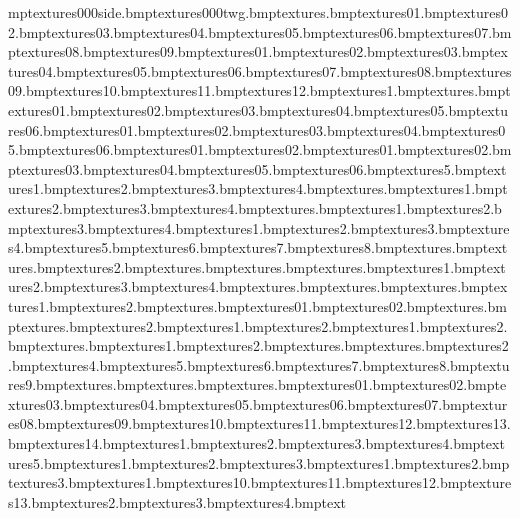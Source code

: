mp textures\1000side.bmp textures\1000twg.bmp textures\antanae.bmp textures\anvil01.bmp textures\anvil02.bmp textures\anvil03.bmp textures\anvil04.bmp textures\anvil05.bmp textures\anvil06.bmp textures\anvil07.bmp textures\anvil08.bmp textures\anvil09.bmp textures\anvilhuge01.bmp textures\anvilhuge02.bmp textures\anvilhuge03.bmp textures\anvilhuge04.bmp textures\anvilhuge05.bmp textures\anvilhuge06.bmp textures\anvilhuge07.bmp textures\anvilhuge08.bmp textures\anvilhuge09.bmp textures\anvilhuge10.bmp textures\anvilhuge11.bmp textures\anvilhuge12.bmp textures\arch1.bmp textures\arrow.bmp textures\blucage01.bmp textures\blucage02.bmp textures\blucage03.bmp textures\blucage04.bmp textures\blucage05.bmp textures\blucage06.bmp textures\bluhut01.bmp textures\bluhut02.bmp textures\bluhut03.bmp textures\bluhut04.bmp textures\bluhut05.bmp textures\bluhut06.bmp textures\bluhutdoor01.bmp textures\bluhutdoor02.bmp textures\bluhutwin01.bmp textures\bluhutwin02.bmp textures\bluhutwin03.bmp textures\bluhutwin04.bmp textures\bluhutwin05.bmp textures\bluhutwin06.bmp textures\bow5.bmp textures\bridge1.bmp textures\bridge2.bmp textures\bridge3.bmp textures\bridge4.bmp textures\bridgeside.bmp textures\bridgesnow1.bmp textures\bridgesnow2.bmp textures\bridgesnow3.bmp textures\bridgesnow4.bmp textures\bridsidextra.bmp textures\bridsnowedge1.bmp textures\bridsnowedge2.bmp textures\bridsnowedge3.bmp textures\bridsnowedge4.bmp textures\browtree1.bmp textures\browtree2.bmp textures\browtree3.bmp textures\browtree4.bmp textures\browtree5.bmp textures\browtree6.bmp textures\browtree7.bmp textures\browtree8.bmp textures\burgbun.bmp textures\burgersign.bmp textures\burgersign2.bmp textures\burgmeat.bmp textures\burgtom.bmp textures\cagebars.bmp textures\cagedoor1.bmp textures\cagedoor2.bmp textures\cagedoor3.bmp textures\cagedoor4.bmp textures\cake.bmp textures\can.bmp textures\canhole.bmp textures\carzywall1.bmp textures\carzywall2.bmp textures\chickleg.bmp textures\choc01.bmp textures\choc02.bmp textures\chocblu.bmp textures\chocwap.bmp textures\chocwap2.bmp textures\clangersign1.bmp textures\clangersign2.bmp textures\cornerwall1.bmp textures\cornerwall2.bmp textures\crackwile.bmp textures\creamwall1.bmp textures\creamwall2.bmp textures\cupbfrt.bmp textures\cupstuff.bmp textures\dangeranvils2.bmp textures\dangeranvils4.bmp textures\dangeranvils5.bmp textures\dangeranvils6.bmp textures\dangeranvils7.bmp textures\dangeranvils8.bmp textures\dangeranvils9.bmp textures\dangercross.bmp textures\dangertarget.bmp textures\dangertargetsand.bmp textures\dirttosand01.bmp textures\dirttosand02.bmp textures\dirttosand03.bmp textures\dirttosand04.bmp textures\dirttosand05.bmp textures\dirttosand06.bmp textures\dirttosand07.bmp textures\dirttosand08.bmp textures\dirttosand09.bmp textures\dirttosand10.bmp textures\dirttosand11.bmp textures\dirttosand12.bmp textures\dirttosand13.bmp textures\dirttosand14.bmp textures\earth1.bmp textures\earth2.bmp textures\earth3.bmp textures\earth4.bmp textures\earth5.bmp textures\eartskel1.bmp textures\eartskel2.bmp textures\eartskel3.bmp textures\elecbox1.bmp textures\elecbox2.bmp textures\elecbox3.bmp textures\elechut1.bmp textures\elechut10.bmp textures\elechut11.bmp textures\elechut12.bmp textures\elechut13.bmp textures\elechut2.bmp textures\elechut3.bmp textures\elechut4.bmp text